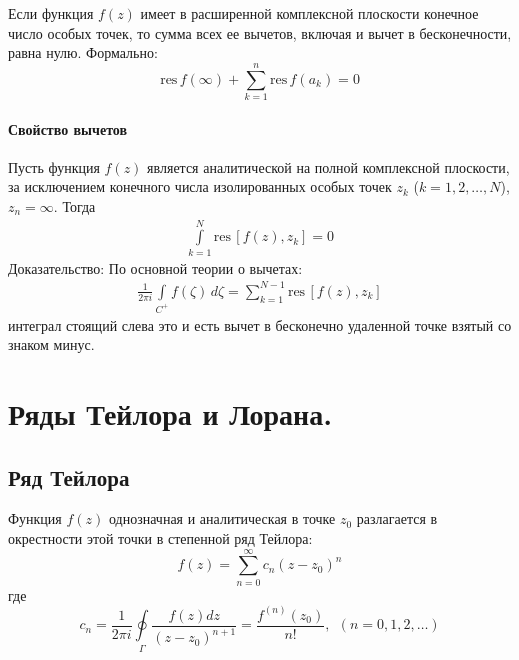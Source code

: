 \documentclass[12pt]{extarticle}
\newcommand{\res}{\mathrm{res}\,}
\renewcommand{\d}{\,d}
\begin{document}
\par Если функция $f(z)$ имеет в расширенной комплексной плоскости
конечное число особых точек, то сумма всех ее вычетов, включая и вычет в
бесконечности, равна нулю. Формально:
\begin{displaymath}
    \res f(\infty)+\sum\limits_{k=1}^{n}\res f(a_{k})=0
\end{displaymath}

\paragraph{Свойство вычетов}
Пусть функция $f(z)$ является аналитической на полной комплексной
плоскости, за исключением конечного числа изолированных особых точек
$z_{k}$ ($k=1,2,\ldots,N$), $z_{n}=\infty$. Тогда
\begin{eqnarray*}
    \int\limits_{k=1}^{N}\res[f(z),z_{k}]=0
\end{eqnarray*}
Доказательство: По основной теории о вычетах:
\begin{eqnarray*}
    \frac{1}{2\pi i}\int\limits_{C^{+}}f(\zeta)\d\zeta
    =\sum\limits_{k=1}^{N-1}\res[f(z),z_{k}]
\end{eqnarray*}
интеграл стоящий слева это и есть вычет в бесконечно удаленной точке
взятый со знаком минус.



\section{Ряды Тейлора и Лорана.}
\subsection{Ряд Тейлора}
Функция $f(z)$ однозначная и аналитическая в точке $z_{0}$ разлагается в
окрестности этой точки в степенной ряд Тейлора:
\begin{displaymath}
    f(z)=\sum\limits_{n=0}^{\infty}c_{n}(z-z_{0})^{n}
\end{displaymath}
где
\begin{displaymath}
    c_{n}=\frac{1}{2\pi i}
    \oint\limits_{\Gamma}\frac{f(z)dz}{(z-z_{0})^{n+1}}
    =\frac{f^{(n)}(z_{0})}{n!},\ \ (n=0,1,2,\ldots)
\end{displaymath}
\end{document}
